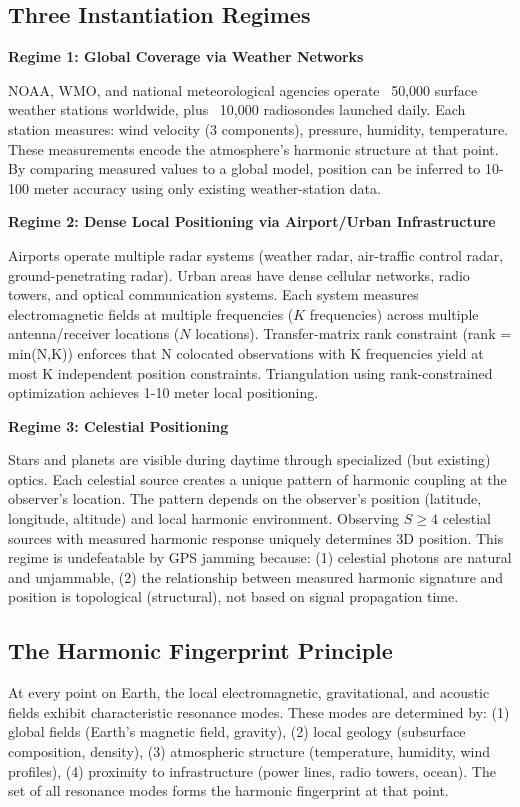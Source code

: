 \documentclass[11pt,twocolumn,a4paper]{article}
\theoremstyle{definition}
\begin{document}
\subsection{Three Instantiation Regimes}

\textbf{Regime 1: Global Coverage via Weather Networks}

NOAA, WMO, and national meteorological agencies operate ~50,000 surface weather stations worldwide, plus ~10,000 radiosondes launched daily. Each station measures: wind velocity (3 components), pressure, humidity, temperature. These measurements encode the atmosphere's harmonic structure at that point. By comparing measured values to a global model, position can be inferred to 10-100 meter accuracy using only existing weather-station data.

\textbf{Regime 2: Dense Local Positioning via Airport/Urban Infrastructure}

Airports operate multiple radar systems (weather radar, air-traffic control radar, ground-penetrating radar). Urban areas have dense cellular networks, radio towers, and optical communication systems. Each system measures electromagnetic fields at multiple frequencies ($K$ frequencies) across multiple antenna/receiver locations ($N$ locations). Transfer-matrix rank constraint (rank = min(N,K)) enforces that N colocated observations with K frequencies yield at most K independent position constraints. Triangulation using rank-constrained optimization achieves 1-10 meter local positioning.

\textbf{Regime 3: Celestial Positioning}

Stars and planets are visible during daytime through specialized (but existing) optics. Each celestial source creates a unique pattern of harmonic coupling at the observer's location. The pattern depends on the observer's position (latitude, longitude, altitude) and local harmonic environment. Observing $S \geq 4$ celestial sources with measured harmonic response uniquely determines 3D position. This regime is undefeatable by GPS jamming because: (1) celestial photons are natural and unjammable, (2) the relationship between measured harmonic signature and position is topological (structural), not based on signal propagation time.

\subsection{The Harmonic Fingerprint Principle}

At every point on Earth, the local electromagnetic, gravitational, and acoustic fields exhibit characteristic resonance modes. These modes are determined by: (1) global fields (Earth's magnetic field, gravity), (2) local geology (subsurface composition, density), (3) atmospheric structure (temperature, humidity, wind profiles), (4) proximity to infrastructure (power lines, radio towers, ocean). The set of all resonance modes forms the harmonic fingerprint at that point.
\end{document}
